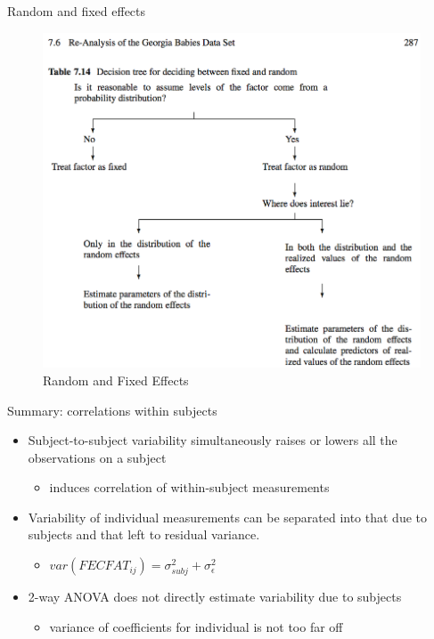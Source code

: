 \documentclass[
  ignorenonframetext,
]{beamer}
\providecommand{\tightlist}{%
  \setlength{\itemsep}{0pt}\setlength{\parskip}{0pt}}
\begin{document}
\begin{frame}{Random and fixed effects}
\protect\hypertarget{random-and-fixed-effects-1}{}

\begin{figure}
\centering
\includegraphics{VittinghoffTable714.png}
\caption{Random and Fixed Effects}
\end{figure}

\end{frame}

\begin{frame}{Summary: correlations within subjects}
\protect\hypertarget{summary-correlations-within-subjects}{}

\begin{itemize}
\tightlist
\item
  Subject-to-subject variability simultaneously raises or lowers all the
  observations on a subject

  \begin{itemize}
  \tightlist
  \item
    induces correlation of within-subject measurements
  \end{itemize}
\item
  Variability of individual measurements can be separated into that due
  to subjects and that left to residual variance.

  \begin{itemize}
  \tightlist
  \item
    \(var(FECFAT_{ij}) = \sigma_{subj}^2 + \sigma_{\epsilon}^2\)
  \end{itemize}
\item
  2-way ANOVA does not directly estimate variability due to subjects

  \begin{itemize}
  \tightlist
  \item
    variance of coefficients for individual is not too far off
  \end{itemize}
\end{itemize}

\end{frame}
\end{document}
